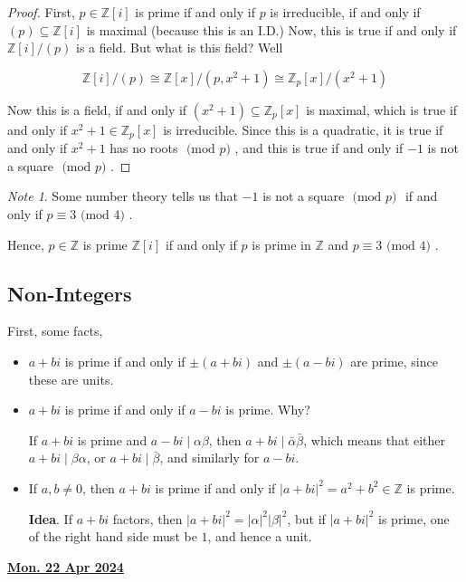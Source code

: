 \documentclass[12pt]{article}
\renewcommand{\date}[1]{\underline{\bf #1}}
\def\Z{{\mathbb Z}}
\renewcommand{\mod}[1]{\text{ (mod $#1$) }}
\theoremstyle{remark}
\theoremstyle{remark}
\theoremstyle{remark}
\theoremstyle{remark}
\theoremstyle{remark}
\newtheorem*{note}{Note}
\begin{document}
\begin{proof}
  First, $p \in \Z[i]$ is prime if and only if $p$ is irreducible, if and only
  if $(p) \subseteq \Z[i]$ is maximal (because this is an I.D.) Now, this is
  true if and only if $\Z[i] / (p)$ is a field. But what is this field? Well

  \[
    \Z[i] / (p) \cong \Z[x] / (p, x^2 + 1) \cong \Z_p[x] / (x^2 + 1)
  \]

  Now this is a field, if and only if $(x^2 + 1) \subseteq \Z_p[x]$ is maximal,
  which is true if and only if $x^2 + 1 \in \Z_p[x]$ is irreducible. Since this
  is a quadratic, it is true if and only if $x^2 + 1$ has no roots $\mod p$, and
  this is true if and only if $-1$ is not a square $\mod p$.
\end{proof}

\begin{note}
  Some number theory tells us that $-1$ is not a square $\mod p$ if and only if $p
  \equiv 3 \mod 4$.
\end{note}

Hence, $p \in \Z$ is prime $\Z[i]$ if and only if $p$ is prime in $\Z$ and $p
\equiv 3 \mod 4$.

\subsection{Non-Integers}

First, some facts,

\begin{itemize}
  \item $a + bi$ is prime if and only if $\pm (a + bi)$ and $\pm (a - bi)$ are
    prime, since these are units.
  \item $a + bi$ is prime if and only if $a - bi$ is prime. Why?

    If $a + bi$ is prime and $a - bi \mid \alpha \beta$, then $a + bi \mid \bar
    \alpha \bar \beta$, which means that either $a + bi \mid \beta \alpha$, or
    $a + bi \mid \bar \beta$, and similarly for $a - bi$.

  \item If $a, b \ne 0$, then $a + bi$ is prime if and only if $|a + bi|^2 = a^2
    + b^2 \in \Z$ is prime.

    {\bf Idea}. If $a + bi$ factors, then $|a + bi|^2 = |\alpha|^2 |\beta|^2$,
    but if $|a + bi|^2$ is prime, one of the right hand side must be $1$, and
    hence a unit.
\end{itemize}

\date{Mon. 22 Apr 2024}
\end{document}
